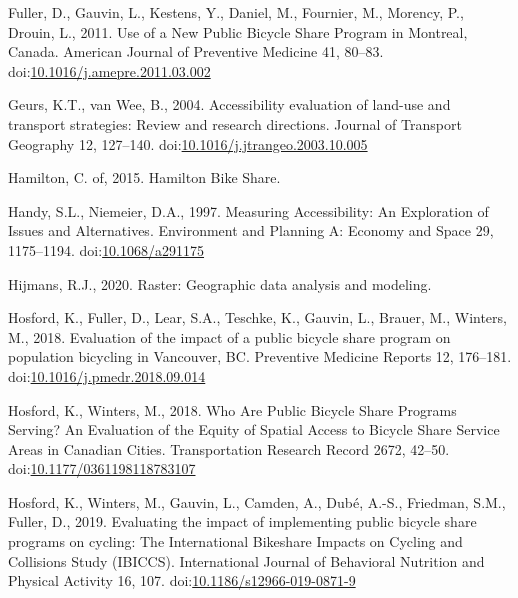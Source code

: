 \documentclass[]{elsarticle} %
\begin{document}
\leavevmode\hypertarget{ref-fullerUseNewPublic2011}{}%
Fuller, D., Gauvin, L., Kestens, Y., Daniel, M., Fournier, M., Morency,
P., Drouin, L., 2011. Use of a New Public Bicycle Share Program in
Montreal, Canada. American Journal of Preventive Medicine 41, 80--83.
doi:\href{https://doi.org/10.1016/j.amepre.2011.03.002}{10.1016/j.amepre.2011.03.002}

\leavevmode\hypertarget{ref-geursAccessibilityEvaluationLanduse2004}{}%
Geurs, K.T., van Wee, B., 2004. Accessibility evaluation of land-use and
transport strategies: Review and research directions. Journal of
Transport Geography 12, 127--140.
doi:\href{https://doi.org/10.1016/j.jtrangeo.2003.10.005}{10.1016/j.jtrangeo.2003.10.005}

\leavevmode\hypertarget{ref-hamiltonHamiltonBikeShare2015}{}%
Hamilton, C. of, 2015. Hamilton Bike Share.

\leavevmode\hypertarget{ref-handyMeasuringAccessibilityExploration1997}{}%
Handy, S.L., Niemeier, D.A., 1997. Measuring Accessibility: An
Exploration of Issues and Alternatives. Environment and Planning A:
Economy and Space 29, 1175--1194.
doi:\href{https://doi.org/10.1068/a291175}{10.1068/a291175}

\leavevmode\hypertarget{ref-R-raster}{}%
Hijmans, R.J., 2020. Raster: Geographic data analysis and modeling.

\leavevmode\hypertarget{ref-hosfordEvaluationImpactPublic2018}{}%
Hosford, K., Fuller, D., Lear, S.A., Teschke, K., Gauvin, L., Brauer,
M., Winters, M., 2018. Evaluation of the impact of a public bicycle
share program on population bicycling in Vancouver, BC. Preventive
Medicine Reports 12, 176--181.
doi:\href{https://doi.org/10.1016/j.pmedr.2018.09.014}{10.1016/j.pmedr.2018.09.014}

\leavevmode\hypertarget{ref-hosfordWhoArePublic2018}{}%
Hosford, K., Winters, M., 2018. Who Are Public Bicycle Share Programs
Serving? An Evaluation of the Equity of Spatial Access to Bicycle Share
Service Areas in Canadian Cities. Transportation Research Record 2672,
42--50.
doi:\href{https://doi.org/10.1177/0361198118783107}{10.1177/0361198118783107}

\leavevmode\hypertarget{ref-hosfordEvaluatingImpactImplementing2019}{}%
Hosford, K., Winters, M., Gauvin, L., Camden, A., Dubé, A.-S., Friedman,
S.M., Fuller, D., 2019. Evaluating the impact of implementing public
bicycle share programs on cycling: The International Bikeshare Impacts
on Cycling and Collisions Study (IBICCS). International Journal of
Behavioral Nutrition and Physical Activity 16, 107.
doi:\href{https://doi.org/10.1186/s12966-019-0871-9}{10.1186/s12966-019-0871-9}
\end{document}
